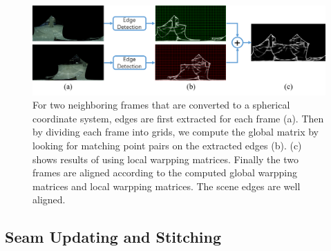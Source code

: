 \documentclass[conference]{IEEEtran}
\begin{document}
\begin{figure}[t]
\centering
\includegraphics[scale=0.35]{picture41.png}
\caption{For two neighboring frames that are converted to a spherical coordinate system, edges are first extracted for each frame 
(a). Then by dividing each frame into grids,  we compute the global matrix by looking for matching point pairs on the extracted edges (b).
(c) shows results of using local warpping matrices.
Finally the two frames are aligned according to the computed global warpping matrices and local warpping matrices. The scene edges are well aligned.}
\label{fig:p8}
\end{figure}

\subsection{Seam Updating and Stitching}
\label{ssec:stitching}
\end{document}
